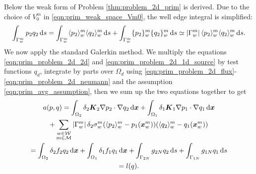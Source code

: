 Below the weak form of Problem \ref{thm:problem_2d_prim} is derived.
Due to the choice of $V^m_0$ in \eqref{eqn:prim_weak_space_Vm0},
the well edge integral is simplified:
\begin{equation} \label{eqn:prim_avg_assumption}
    \int_{\Gamma^m_w} p_2q_2 \dd s %
    =  \int_{\Gamma^m_w} \avg{p_2}^m_w\avg{q_2}^m_w \dd s + \int_{\Gamma^m_w} \fluct{p_2}^m_w\fluct{q_2}^m_w \dd s \simeq \abs{\Gamma^m_w} \avg{p_2}^m_w\avg{q_2}^m_w \dd s.
\end{equation}
We now apply the standard Galerkin method. We multiply the equations \eqref{eqn:prim_problem_2d_2d} and \eqref{eqn:prim_problem_2d_1d_source}
by test functions $q_d$, integrate by parts over $\Omega_d$ using \eqref{eqn:prim_problem_2d_flux}-\eqref{eqn:prim_problem_2d_neumann} and the assumption \eqref{eqn:prim_avg_assumption}, 
then we sum up the two equations together to get
\begin{multline} \label{eqn:prim_weak_form}
  a(p,q) =
  \int_{\Omega_2} \delta_2 \mathbf{\boldsymbol{K}}_2 \nabla p_2 \cdot \nabla q_2 \,{\rm d}\mathbf{\boldsymbol{x}}
  + \int_{\Omega_1} \delta_1 \mathbf{\boldsymbol{K}}_1 \nabla p_1 \cdot \nabla q_1 \,{\rm d}\mathbf{\boldsymbol{x}} \\
  + \sum_{\substack{w\in \mathcal{W} \\ m\in \mathcal{M}}} \left|\Gamma^m_w\right| \delta_2 \sigma^m_w (\langle p_2\rangle^m_w - p_1(\mathbf{\boldsymbol{x}}^m_w)) (\langle q_2\rangle^m_w - q_1(\mathbf{\boldsymbol{x}}^m_w)) \\
  = \int_{\Omega_2} \delta_2 f_2 q_2 \,{\rm d}\mathbf{\boldsymbol{x}} + \int_{\Omega_1} \delta_1 f_1 q_1 \,{\rm d}\mathbf{\boldsymbol{x}}
  + \int_{\Gamma_{2N}} g_{2N}q_2 \,{\rm d} s + \int_{\Gamma_{1N}} g_{1N}q_1 \,{\rm d} s \\
  = l(q).
\end{multline}



